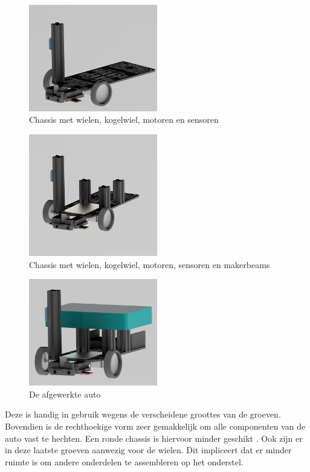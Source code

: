 \documentclass[a4paper,twoside,kulak]{kulakreport} %
\begin{document}
\begin{figure}
	\includegraphics[width=0.5\textwidth]{2sensoren}
	\centering
	\caption{Chassis met wielen, kogelwiel, motoren en sensoren}
	\label{opbouw2}
\end{figure}

\begin{figure}
	\includegraphics[width=0.5\textwidth]{3voorlaatste}
	\centering
	\caption{Chassis met wielen, kogelwiel, motoren, sensoren en makerbeams} 
\label{opbouw3}
\end{figure}

\begin{figure}
	\includegraphics[width=0.5\textwidth]{4Volledig}
	\centering
	\caption{De afgewerkte auto}
	\label{opbouw4}
\end{figure}

Deze is handig in gebruik wegens de verscheidene groottes van de groeven. %
Bovendien is de rechthoekige vorm zeer gemakkelijk om alle componenten van de auto vast te hechten. Een ronde chassis is hiervoor minder geschikt \cite{RobotChassis}. Ook zijn er in deze laatste groeven aanwezig voor de wielen. Dit impliceert dat er minder ruimte is om andere onderdelen te assembleren op het onderstel. %
\label{Chassis}
\end{document}

